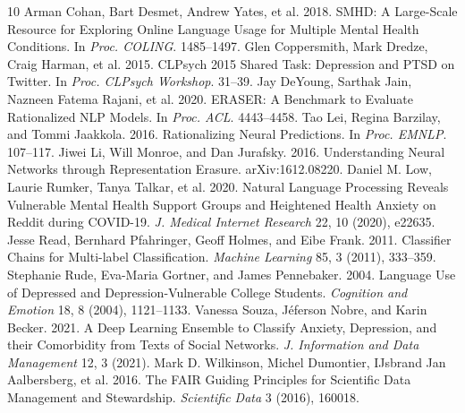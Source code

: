 \documentclass[sigconf]{acmart}
\begin{document}
\begin{thebibliography}{10}
 Arman Cohan, Bart Desmet, Andrew Yates, et al. 2018. SMHD: A Large-Scale Resource for Exploring Online Language Usage for Multiple Mental Health Conditions. In \textit{Proc. COLING}. 1485--1497.
 Glen Coppersmith, Mark Dredze, Craig Harman, et al. 2015. CLPsych 2015 Shared Task: Depression and PTSD on Twitter. In \textit{Proc. CLPsych Workshop}. 31--39.
 Jay DeYoung, Sarthak Jain, Nazneen Fatema Rajani, et al. 2020. ERASER: A Benchmark to Evaluate Rationalized NLP Models. In \textit{Proc. ACL}. 4443--4458.
 Tao Lei, Regina Barzilay, and Tommi Jaakkola. 2016. Rationalizing Neural Predictions. In \textit{Proc. EMNLP}. 107--117.
 Jiwei Li, Will Monroe, and Dan Jurafsky. 2016. Understanding Neural Networks through Representation Erasure. arXiv:1612.08220.
 Daniel M. Low, Laurie Rumker, Tanya Talkar, et al. 2020. Natural Language Processing Reveals Vulnerable Mental Health Support Groups and Heightened Health Anxiety on Reddit during COVID-19. \textit{J. Medical Internet Research} 22, 10 (2020), e22635.
 Jesse Read, Bernhard Pfahringer, Geoff Holmes, and Eibe Frank. 2011. Classifier Chains for Multi-label Classification. \textit{Machine Learning} 85, 3 (2011), 333--359.
 Stephanie Rude, Eva-Maria Gortner, and James Pennebaker. 2004. Language Use of Depressed and Depression-Vulnerable College Students. \textit{Cognition and Emotion} 18, 8 (2004), 1121--1133.
 Vanessa Souza, J\'eferson Nobre, and Karin Becker. 2021. A Deep Learning Ensemble to Classify Anxiety, Depression, and their Comorbidity from Texts of Social Networks. \textit{J. Information and Data Management} 12, 3 (2021).
 Mark D. Wilkinson, Michel Dumontier, IJsbrand Jan Aalbersberg, et al. 2016. The FAIR Guiding Principles for Scientific Data Management and Stewardship. \textit{Scientific Data} 3 (2016), 160018.
\end{thebibliography}
\end{document}
